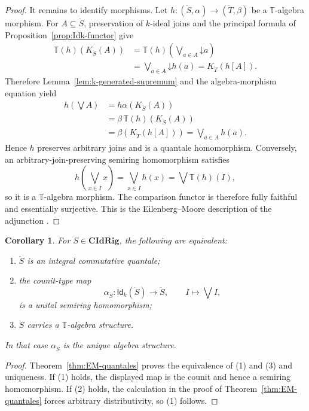 \documentclass[12pt,leqno]{amsart}
\newcommand{\CIdRig}{\mathbf{CIdRig}}
\newcommand{\Idk}{\mathsf{Id}_{k}}
\newtheorem{corollary}[theorem]{Corollary}
\theoremstyle{definition}
\numberwithin{equation}{section}
\theoremstyle{remark}
\begin{document}
\begin{proof}
It remains to identify morphisms. Let
\(h\colon(\ddot S,\alpha)\to(\ddot T,\beta)\) be a \(\mathbb T\)-algebra morphism. For \(A\subseteq\ddot S\), preservation of $k$-ideal joins and the principal formula of Proposition~\ref{prop:Idk-functor} give
\begin{align*}
\mathbb T(h)(K_{\ddot S}(A))
 &=\mathbb T(h)\left(
   \mathop{\bigvee{}^k}_{a\in A}\mathord\downarrow a
   \right)\\
 &=\mathop{\bigvee{}^k}_{a\in A}\mathord\downarrow h(a)
 =K_{\ddot T}(h[A]).
\end{align*}
Therefore Lemma~\ref{lem:k-generated-supremum} and the algebra-morphism equation yield
\begin{align*}
h\left(\bigvee A\right)
 &=h\alpha(K_{\ddot S}(A))\\
 &=\beta\,\mathbb T(h)(K_{\ddot S}(A))\\
 &=\beta(K_{\ddot T}(h[A]))
 =\bigvee_{a\in A}h(a).
\end{align*}
Hence $h$ preserves arbitrary joins and is a quantale homomorphism. Conversely, an arbitrary-join-preserving semiring homomorphism satisfies
\[
h\left(\bigvee_{x\in I}x\right)
 =\bigvee_{x\in I}h(x)
 =\bigvee\mathbb T(h)(I),
\]
so it is a \(\mathbb T\)-algebra morphism. The comparison functor is therefore fully faithful and essentially surjective. This is the Eilenberg--Moore description of the adjunction \cite{EM65}.
\end{proof}

\begin{corollary}\label{cor:quantale-reflection-test}
For \(\ddot S\in\CIdRig\), the following are equivalent:
\begin{enumerate}
\item \(\ddot S\) is an integral commutative quantale;
\item the counit-type map
\[
\alpha_{\ddot S}\colon\Idk(\ddot S)\longrightarrow\ddot S,
\qquad
I\longmapsto\bigvee I,
\]
is a unital semiring homomorphism;
\item \(\ddot S\) carries a \(\mathbb T\)-algebra structure.
\end{enumerate}
In that case \(\alpha_{\ddot S}\) is the unique algebra structure.
\end{corollary}

\begin{proof}
Theorem~\ref{thm:EM-quantales} proves the equivalence of (1) and (3) and uniqueness. If (1) holds, the displayed map is the counit and hence a semiring homomorphism. If (2) holds, the calculation in the proof of Theorem~\ref{thm:EM-quantales} forces arbitrary distributivity, so (1) follows.
\end{proof}
\vskip 1cm
\end{document}
